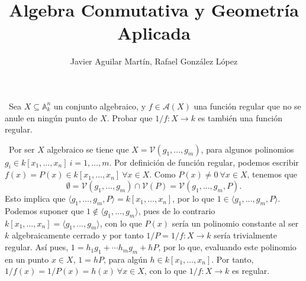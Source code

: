 \documentclass[twoside]{article}
\begin{document}
\title{Algebra Conmutativa y Geometría Aplicada}
\author{Javier Aguilar Martín, Rafael González López}
\maketitle

\begin{ejercicio}{2}\
Sea $X \subseteq \mathbb{A}^n_k$
un conjunto algebraico, y $f \in \mathcal{A}(X)$ una función
regular que no se anule en ningún punto de $X$. Probar que $1/f : X \to k$ es
también una función regular.
\end{ejercicio}
\begin{solucion}\
Por ser $X$ algebraico se tiene que $X=\mathcal{V}(g_1,\dots,g_m)$, para algunos polinomios $g_i\in k[x_1,\dots,x_n]\ i=1,\dots,m$. Por definición de función regular, podemos escribir $f(x)=P(x)\in k[x_1,\dots, x_n]\ \forall x\in X$. Como $P(x)\neq 0\ \forall x\in X$, tenemos que 
$$\emptyset=\mathcal{V}(g_1,\dots,g_m)\cap\mathcal{V}(P)=\mathcal{V}(g_1,\dots,g_m,P).$$
Esto implica que $\langle g_1,\dots,g_m,P\rangle=k[x_1,\dots, x_n]$, por lo que $1\in \langle g_1,\dots,g_m,P\rangle$. Podemos suponer que $1\notin \langle g_1,\dots,g_m\rangle$, pues de lo contrario $k[x_1,\dots, x_n]=\langle g_1,\dots,g_m\rangle$, con lo que $P(x)$ sería un polinomio constante al ser $k$ algebraicamente cerrado y por tanto $1/P=1/f:X\to k$ sería trivialmente regular. Así pues, $1= h_1g_1+\cdots h_mg_m+hP$, por lo que, evaluando este polinomio en un punto $x\in X$, $1=hP$, para algún $h\in k[x_1,\dots, x_n]$. Por tanto, $1/f(x)=1/P(x)=h(x)\ \forall x\in X$, con lo que $1/f:X\to k$ es regular. 


\end{solucion}

\newpage
\end{document}
